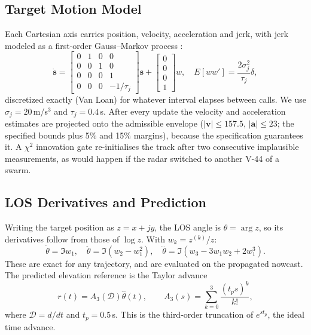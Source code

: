 \documentclass[conference]{IEEEtran}
\newcommand{\D}{\mathcal{D}}
\begin{document}
\subsection{Target Motion Model}
Each Cartesian axis carries position, velocity, acceleration and jerk, with jerk modeled as a first-order Gauss--Markov process \cite{mehrotra1997jerk}:
\begin{equation}
\dot{\mathbf s}=\begin{bmatrix}0&1&0&0\\0&0&1&0\\0&0&0&1\\0&0&0&-1/\tau_j\end{bmatrix}\mathbf s+\begin{bmatrix}0\\0\\0\\1\end{bmatrix}w,\quad E[w w']=\frac{2\sigma_j^2}{\tau_j}\delta,
\end{equation}
discretized exactly (Van Loan) for whatever interval elapses between calls. We use $\sigma_j=20$\,m/s$^3$ and $\tau_j=0.4$\,s. After every update the velocity and acceleration estimates are projected onto the admissible envelope ($|\mathbf v|\le157.5$, $|\mathbf a|\le23$; the specified bounds plus 5\% and 15\% margins), because the specification guarantees it. A $\chi^2$ innovation gate re-initialises the track after two consecutive implausible measurements, as would happen if the radar switched to another V-44 of a swarm.

\subsection{LOS Derivatives and Prediction}
Writing the target position as $z=x+jy$, the LOS angle is $\theta=\arg z$, so its derivatives follow from those of $\log z$. With $w_k=z^{(k)}/z$:
\begin{equation}
\dot\theta=\Im w_1,\quad \ddot\theta=\Im(w_2-w_1^2),\quad \dddot\theta=\Im(w_3-3w_1w_2+2w_1^3).
\end{equation}
These are exact for any trajectory, and are evaluated on the propagated nowcast. The predicted elevation reference is the Taylor advance
\begin{equation}
r(t)=A_3(\D)\hat\theta(t),\qquad A_3(s)=\sum_{k=0}^{3}\frac{(t_ps)^k}{k!},
\label{eq:pred}
\end{equation}
where $\D=d/dt$ and $t_p=0.5$\,s. This is the third-order truncation of $e^{st_p}$, the ideal time advance.
\end{document}
